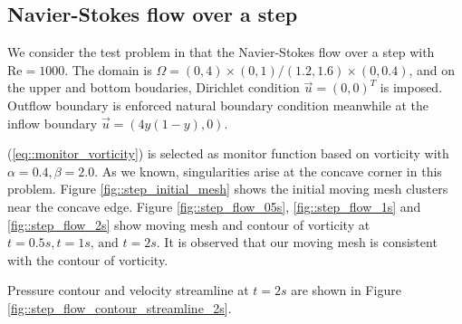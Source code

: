 \documentclass[a4paper, 11pt]{article}
\begin{document}

   \subsection{Navier-Stokes flow over a step}

      We consider the test problem in \cite{zheng2010posteriori} that the
      Navier-Stokes flow over a step with $\text{Re} = 1000$. The
      domain is $\Omega = (0, 4) \times (0, 1)/(1.2, 1.6) \times (0,
      0.4)$, and on the upper and bottom boudaries, Dirichlet
      condition $\vec{u} = (0, 0)^T$ is imposed. Outflow boundary is
      enforced natural boundary condition meanwhile at the inflow
      boundary $\vec{u} = (4 y (1 - y), 0)$.

      (\ref{eq::monitor_vorticity}) is selected as monitor function
      based on vorticity with $\alpha = 0.4, \beta = 2.0$. As we
      known, singularities arise at the concave corner in this
      problem. Figure \ref{fig::step_initial_mesh} shows the initial
      moving mesh clusters near the concave edge. Figure
      \ref{fig::step_flow_05s}, \ref{fig::step_flow_1s} and
      \ref{fig::step_flow_2s} show moving mesh and contour of
      vorticity at $t = 0.5s, t = 1s \text{, and } t = 2s$. It is
      observed that our moving mesh is consistent with the contour of
      vorticity.

      Pressure contour and velocity streamline at $t = 2s$ are shown
      in Figure \ref{fig::step_flow_contour_streamline_2s}.      
       
\end{document}
